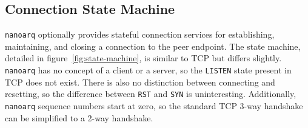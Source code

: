 \documentclass[11pt]{article}
\newcommand{\nanoarq}{\texttt{nanoarq}}
\begin{document}
\subsection{Connection State Machine}
\nanoarq{} optionally provides stateful connection services for establishing, maintaining, and closing a connection to the peer endpoint. The state machine, detailed in figure~\ref{fig:state-machine}, is similar to TCP but differs slightly. \nanoarq{} has no concept of a client or a server, so the \texttt{LISTEN} state present in TCP does not exist. There is also no distinction between connecting and resetting, so the difference between \texttt{RST} and \texttt{SYN} is uninteresting. Additionally, \nanoarq{} sequence numbers start at zero, so the standard TCP 3-way handshake can be simplified to a 2-way handshake. \par
{}
\end{document}
